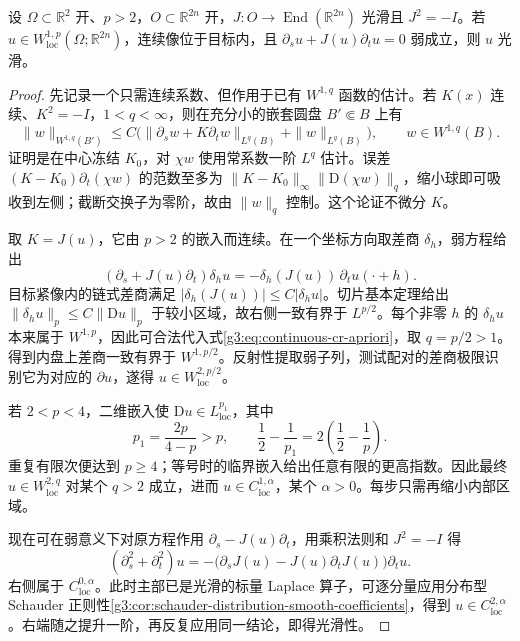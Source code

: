 \begin{proposition}\label{g3:prop:weak-cr-smooth-bootstrap}
	设 \(\Omega\subset\mathbb R^2\) 开、\(p>2\)，\(O\subset\mathbb R^{2n}\) 开，\(J:O\to\operatorname{End}(\mathbb R^{2n})\) 光滑且 \(J^2=-I\)。若 \(u\in W^{1,p}_{\mathrm{loc}}(\Omega;\mathbb R^{2n})\)，连续像位于目标内，且
	\(\partial_su+J(u)\partial_tu=0\) 弱成立，则 \(u\) 光滑。
\end{proposition}
\begin{proof}
	先记录一个只需连续系数、但作用于已有 \(W^{1,q}\) 函数的估计。若 \(K(x)\) 连续、\(K^2=-I\)，\(1<q<\infty\)，则在充分小的嵌套圆盘 \(B'\Subset B\) 上有
	\begin{equation}\label{g3:eq:continuous-cr-apriori}
		\|w\|_{W^{1,q}(B')}
		\le C\bigl(\|\partial_sw+K\partial_tw\|_{L^q(B)}
		+\|w\|_{L^q(B)}\bigr),\qquad w\in W^{1,q}(B).
	\end{equation}
	证明是在中心冻结 \(K_0\)，对 \(\chi w\) 使用常系数一阶 \(L^q\) 估计。误差 \((K-K_0)\partial_t(\chi w)\) 的范数至多为 \(\|K-K_0\|_\infty\|\mathrm D(\chi w)\|_q\)，缩小球即可吸收到左侧；截断交换子为零阶，故由 \(\|w\|_q\) 控制。这个论证不微分 \(K\)。

	取 \(K=J(u)\)，它由 \(p>2\) 的嵌入而连续。在一个坐标方向取差商 \(\delta_h\)，弱方程给出
	\[
		(\partial_s+J(u)\partial_t)\delta_hu
		=-\delta_h(J(u))\,\partial_tu(\cdot+h).
	\]
	目标紧像内的链式差商满足 \(|\delta_h(J(u))|\le C|\delta_hu|\)。切片基本定理给出 \(\|\delta_hu\|_p\le C\|\mathrm Du\|_p\) 于较小区域，故右侧一致有界于 \(L^{p/2}\)。每个非零 \(h\) 的 \(\delta_hu\) 本来属于 \(W^{1,p}\)，因此可合法代入式\eqref{g3:eq:continuous-cr-apriori}，取 \(q=p/2>1\)。得到内盘上差商一致有界于 \(W^{1,p/2}\)。反射性提取弱子列，测试配对的差商极限识别它为对应的 \(\partial u\)，遂得 \(u\in W^{2,p/2}_{\mathrm{loc}}\)。

	若 \(2<p<4\)，二维嵌入使 \(\mathrm Du\in L^{p_1}_{\mathrm{loc}}\)，其中
	\[
		p_1=\frac{2p}{4-p}>p,\qquad
		\frac12-\frac1{p_1}=2\left(\frac12-\frac1p\right).
	\]
	重复有限次便达到 \(p\ge4\)；等号时的临界嵌入给出任意有限的更高指数。因此最终 \(u\in W^{2,q}_{\mathrm{loc}}\) 对某个 \(q>2\) 成立，进而 \(u\in C^{1,\alpha}_{\mathrm{loc}}\)，某个 \(\alpha>0\)。每步只需再缩小内部区域。

	现在可在弱意义下对原方程作用 \(\partial_s-J(u)\partial_t\)，用乘积法则和 \(J^2=-I\) 得
	\[
		(\partial_s^2+\partial_t^2)u
		=-\bigl(\partial_sJ(u)-J(u)\partial_tJ(u)\bigr)\partial_tu.
	\]
	右侧属于 \(C^{0,\alpha}_{\mathrm{loc}}\)。此时主部已是光滑的标量 Laplace 算子，可逐分量应用分布型 Schauder 正则性\cref{g3:cor:schauder-distribution-smooth-coefficients}，得到 \(u\in C^{2,\alpha}_{\mathrm{loc}}\)。右端随之提升一阶，再反复应用同一结论，即得光滑性。
\end{proof}

